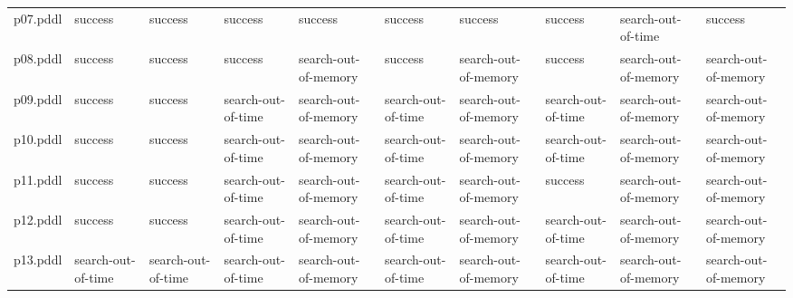\documentclass{article}
\begin{document}
\begin{tabular}{@{}lrrrrrrrrr@{}}
p07.pddl & \multicolumn{1}{|l|}{success} & \multicolumn{1}{|l|}{success} & \multicolumn{1}{|l|}{success} & \multicolumn{1}{|l|}{success} & \multicolumn{1}{|l|}{success} & \multicolumn{1}{|l|}{success} & \multicolumn{1}{|l|}{success} & \multicolumn{1}{|l|}{search-out-of-time} & \multicolumn{1}{|l|}{success} \\
p08.pddl & \multicolumn{1}{|l|}{success} & \multicolumn{1}{|l|}{success} & \multicolumn{1}{|l|}{success} & \multicolumn{1}{|l|}{search-out-of-memory} & \multicolumn{1}{|l|}{success} & \multicolumn{1}{|l|}{search-out-of-memory} & \multicolumn{1}{|l|}{success} & \multicolumn{1}{|l|}{search-out-of-memory} & \multicolumn{1}{|l|}{search-out-of-memory} \\
p09.pddl & \multicolumn{1}{|l|}{success} & \multicolumn{1}{|l|}{success} & \multicolumn{1}{|l|}{search-out-of-time} & \multicolumn{1}{|l|}{search-out-of-memory} & \multicolumn{1}{|l|}{search-out-of-time} & \multicolumn{1}{|l|}{search-out-of-memory} & \multicolumn{1}{|l|}{search-out-of-time} & \multicolumn{1}{|l|}{search-out-of-memory} & \multicolumn{1}{|l|}{search-out-of-memory} \\
p10.pddl & \multicolumn{1}{|l|}{success} & \multicolumn{1}{|l|}{success} & \multicolumn{1}{|l|}{search-out-of-time} & \multicolumn{1}{|l|}{search-out-of-memory} & \multicolumn{1}{|l|}{search-out-of-time} & \multicolumn{1}{|l|}{search-out-of-memory} & \multicolumn{1}{|l|}{search-out-of-time} & \multicolumn{1}{|l|}{search-out-of-memory} & \multicolumn{1}{|l|}{search-out-of-memory} \\
p11.pddl & \multicolumn{1}{|l|}{success} & \multicolumn{1}{|l|}{success} & \multicolumn{1}{|l|}{search-out-of-time} & \multicolumn{1}{|l|}{search-out-of-memory} & \multicolumn{1}{|l|}{search-out-of-time} & \multicolumn{1}{|l|}{search-out-of-memory} & \multicolumn{1}{|l|}{success} & \multicolumn{1}{|l|}{search-out-of-memory} & \multicolumn{1}{|l|}{search-out-of-memory} \\
p12.pddl & \multicolumn{1}{|l|}{success} & \multicolumn{1}{|l|}{success} & \multicolumn{1}{|l|}{search-out-of-time} & \multicolumn{1}{|l|}{search-out-of-memory} & \multicolumn{1}{|l|}{search-out-of-time} & \multicolumn{1}{|l|}{search-out-of-memory} & \multicolumn{1}{|l|}{search-out-of-time} & \multicolumn{1}{|l|}{search-out-of-memory} & \multicolumn{1}{|l|}{search-out-of-memory} \\
p13.pddl & \multicolumn{1}{|l|}{search-out-of-time} & \multicolumn{1}{|l|}{search-out-of-time} & \multicolumn{1}{|l|}{search-out-of-time} & \multicolumn{1}{|l|}{search-out-of-memory} & \multicolumn{1}{|l|}{search-out-of-time} & \multicolumn{1}{|l|}{search-out-of-memory} & \multicolumn{1}{|l|}{search-out-of-time} & \multicolumn{1}{|l|}{search-out-of-memory} & \multicolumn{1}{|l|}{search-out-of-memory} \\

\end{tabular}
\end{document}

